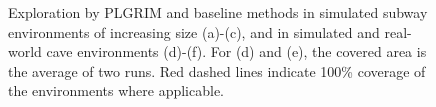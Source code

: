 \documentclass[letterpaper]{article} %
\begin{document}
\begin{figure}[t!]
				\caption{Exploration by PLGRIM and baseline methods in simulated subway environments of increasing size (a)-(c), and in simulated and real-world cave environments (d)-(f). For (d) and (e), the covered area is the average of two runs. Red dashed lines indicate 100\% coverage of the environments where applicable.}
    \label{fig:all_together_plot}
\end{figure}
\end{document}

